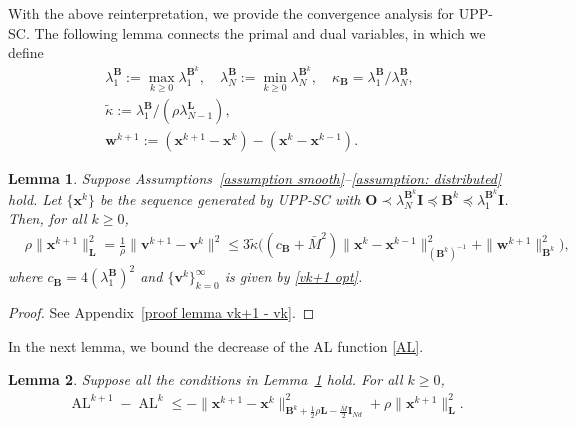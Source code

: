 \documentclass[10pt,a4paper]{amsart}
\newtheorem{lemma}{Lemma}
\begin{document}
With the above reinterpretation, we provide the convergence analysis for UPP-SC. The following lemma connects the primal and dual variables, in which we define 
\begin{gather}
	\label{kappa B} \lambda_1^{\mathbf{B}}:= \max_{k \geq 0} \lambda_1^{\mathbf{B}^k}, \quad \lambda_N^{\mathbf{B}}:= \min_{k \geq 0} \lambda_N^{\mathbf{B}^k}, \quad \kappa_{\mathbf{B}} = {\lambda_1^{\mathbf{B}}}/{\lambda_N^{\mathbf{B}}},\\
	\label{tilde kappa} \tilde{\kappa} := {\lambda_1^{\mathbf{B}}}/({\rho \lambda_{N-1}^{\mathbf{L}}}), \\ 
	\label{wk+1} \mathbf{w}^{k+1} := (\mathbf{x}^{k+1}-\mathbf{x}^{k})-(\mathbf{x}^{k}-\mathbf{x}^{k-1}).
\end{gather}

\begin{lemma} \label{lemma vk+1 - vk}
	Suppose Assumptions~\ref{assumption smooth}--\ref{assumption: distributed} hold. Let $\{\mathbf{x}^k\}$ be the sequence generated by UPP-SC with $\mathbf{O}\prec \lambda_N^{\mathbf{B}^k} \mathbf{I}\preceq \mathbf{B}^{k}\preceq \lambda_1^{\mathbf{B}^k}\mathbf{I} $. Then, for all $k\geq 0$,
	\begin{align}
		&\rho\|\mathbf{x}^{k+1}\|^2_{\mathbf{L}}=\frac{1}{\rho}\|\mathbf{v}^{k+1}-\mathbf{v}^k\|^2\leq 3\tilde{\kappa} \big((c_{\mathbf{B}}+\bar{M}^2)\|\mathbf{x}^k-\mathbf{x}^{k-1}\|^2_{(\mathbf{B}^{k})^{-1}}+\|\mathbf{w}^{k+1}\|^2_{\mathbf{B}^k}\big), \label{vk+1 - vk}
	\end{align}
	where $c_{\mathbf{B}}=4(\lambda_1^\mathbf{B})^2$ and $\{\mathbf{v}^k\}_{k=0}^\infty$ is given by \eqref{vk+1 opt}.
\end{lemma}
\begin{proof}
	See Appendix~\ref{proof lemma vk+1 - vk}.
\end{proof}

In the next lemma, we bound the decrease of the AL function \eqref{AL}.

\begin{lemma} \label{lemma ALk+1 - ALk}
	Suppose all the conditions in Lemma~\ref{lemma vk+1 - vk} hold. For all $k\geq 0$,
	\begin{align}
		&\operatorname{AL}^{k+1}-\operatorname{AL}^{k} \leq  -\|\mathbf{x}^{k+1}-\mathbf{x}^{k}\|^2_{\mathbf{B}^k+\frac{1}{2}\rho \mathbf{L}-\frac{\bar{M}}{2}\mathbf{I}_{Nd}} + \rho\|\mathbf{x}^{k+1}\|^2_{\mathbf{L}}. \label{ALk+1 - ALk lemma}
	\end{align}
\end{lemma}
\end{document}
